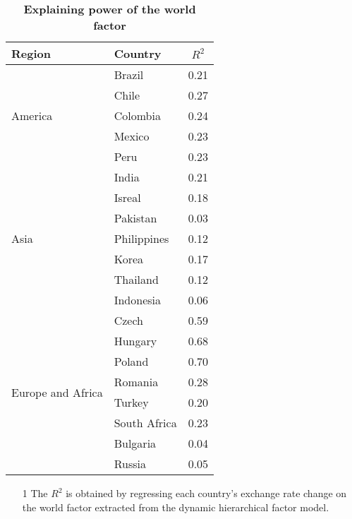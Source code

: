 \documentclass[12pt]{article}
\numberwithin{equation}{section}
\begin{document}
\begin{table}[htbp]
\begin{minipage}{\textwidth}
{\begin{itemize}
\end{itemize}
}
\end{minipage}
  \label{tab:vd2}%

\end{table}%


\clearpage


\begin{table}[htbp]
  \centering

  \caption{\textbf{Explaining power of the world factor}}
    \begin{tabularx}{\textwidth}{@{\extracolsep{\fill}}ll|c}
    \hline\hline
Region	&	Country	&	$R^2$	\\	\hline
\multirow{5}{*}{America}	&	Brazil	&	0.21 	\\	
	&	Chile	&	0.27 	\\	
	&	Colombia	&	0.24 	\\	
	&	Mexico	&	0.23 	\\	
	&	Peru	&	0.23 	\\	\hline
\multirow{7}{*}{Asia}	&	India	&	0.21 	\\	
	&	Isreal	&	0.18 	\\	
	&	Pakistan	&	0.03 	\\	
	&	Philippines	&	0.12 	\\	
	&	Korea	&	0.17 	\\	
	&	Thailand	&	0.12 	\\	
	&	Indonesia	&	0.06 	\\	\hline
\multirow{8}{*}{Europe and Africa}	&	Czech	&	0.59 	\\	
	&	Hungary	&	0.68 	\\	
	&	Poland	&	0.70 	\\	
	&	Romania	&	0.28 	\\	
	&	Turkey	&	0.20 	\\	
	&	South Africa	&	0.23 	\\	
	&	Bulgaria	&	0.04 	\\	
	&	Russia	&	0.05 	\\	
    \hline\hline
    \end{tabularx}%
  \label{tab:r2}%

\begin{minipage}{\textwidth}
{			
    \begin{itemize}
\item[1]  The $R^2$ is obtained by regressing each country's exchange rate change on the world factor extracted from the dynamic hierarchical factor model.
 \end{itemize}
}
\end{minipage}
\end{table}%
\end{document}
